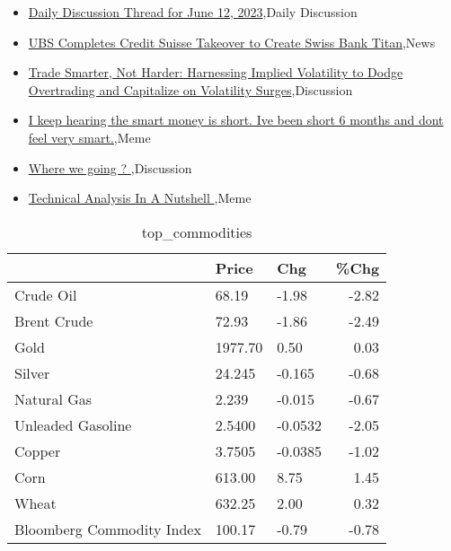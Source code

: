 \documentclass{article}%
\begin{document}
%
\begin{itemize}%
\item%
\href{https://reddit.com/r/wallstreetbets/comments/147k9is/daily\_discussion\_thread\_for\_june\_12\_2023/}{Daily Discussion Thread for June 12, 2023},Daily Discussion%
\item%
\href{https://reddit.com/r/wallstreetbets/comments/147fkdz/ubs\_completes\_credit\_suisse\_takeover\_to\_create/}{UBS Completes Credit Suisse Takeover to Create Swiss Bank Titan},News%
\item%
\href{https://reddit.com/r/wallstreetbets/comments/147eytx/trade\_smarter\_not\_harder\_harnessing\_implied/}{Trade Smarter, Not Harder: Harnessing Implied Volatility to Dodge Overtrading and Capitalize on Volatility Surges},Discussion%
\item%
\href{https://reddit.com/r/wallstreetbets/comments/147eftv/i\_keep\_hearing\_the\_smart\_money\_is\_short\_ive\_been/}{I keep hearing the smart money is short. Ive been short 6 months and dont feel very smart.},Meme%
\item%
\href{https://reddit.com/r/StockMarket/comments/147f02c/where\_we\_going/}{Where we going ?  },Discussion%
\item%
\href{https://reddit.com/r/StockMarket/comments/147co98/technical\_analysis\_in\_a\_nutshell/}{Technical Analysis In A Nutshell },Meme%
\end{itemize}%


\begin{table}[htbp]%
\caption{top\_commodities}%
\centering%
\begin{adjustbox}{width=1\textwidth}%
\begin{tabular}{lllr}
\toprule
                          &   Price &     Chg &  \%Chg \\
\midrule
               Crude Oil  &   68.19 &   -1.98 & -2.82 \\
             Brent Crude  &   72.93 &   -1.86 & -2.49 \\
                    Gold  & 1977.70 &    0.50 &  0.03 \\
                  Silver  &  24.245 &  -0.165 & -0.68 \\
             Natural Gas  &   2.239 &  -0.015 & -0.67 \\
       Unleaded Gasoline  &  2.5400 & -0.0532 & -2.05 \\
                  Copper  &  3.7505 & -0.0385 & -1.02 \\
                    Corn  &  613.00 &    8.75 &  1.45 \\
                   Wheat  &  632.25 &    2.00 &  0.32 \\
Bloomberg Commodity Index &  100.17 &   -0.79 & -0.78 \\
\bottomrule
\end{tabular}
%
\end{adjustbox}%
\end{table}
\end{document}
